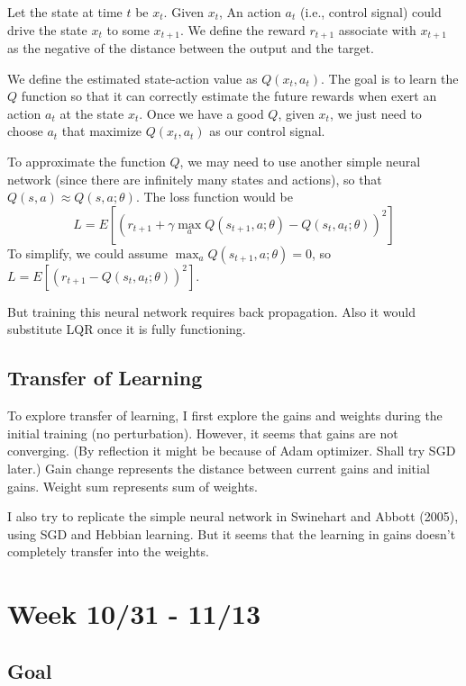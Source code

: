 \documentclass[12pt, a4paper]{article}
\begin{document}
Let the state at time $t$ be $x_t$. Given $x_t$, An action $a_t$ (i.e., control signal) could drive the state $x_t$ to some $x_{t+1}$. We define the reward $r_{t+1}$ associate with $x_{t+1}$ as the negative of the distance between the output and the target.

We define the estimated state-action value as $Q(x_t, a_t)$. The goal is to learn the $Q$ function so that it can correctly estimate the future rewards when exert an action $a_t$ at the state $x_t$. Once we have a good $Q$, given $x_t$, we just need to choose $a_t$ that maximize $Q(x_t, a_t)$ as our control signal.

To approximate the function $Q$, we may need to use another simple neural network (since there are infinitely many states and actions), so that $Q(s,a) \approx Q(s,a;\theta)$. The loss function would be 
$$ L = E \left[ \left( r_{t+1} + \gamma \max_{a} Q(s_{t+1},a; \theta) - Q(s_t, a_t; \theta) \right)^2 \right] $$
To simplify, we could assume $\max_{a} Q(s_{t+1}, a; \theta) = 0$, so $ L = E \left[ \left( r_{t+1} - Q(s_t, a_t; \theta) \right)^2 \right] $. 

But training this neural network requires back propagation. Also it would substitute LQR once it is fully functioning.

\newpage

\subsection*{Transfer of Learning}

To explore transfer of learning, I first explore the gains and weights during the initial training (no perturbation). However, it seems that gains are not converging. (By reflection it might be because of Adam optimizer. Shall try SGD later.) Gain change represents the distance between current gains and initial gains. Weight sum represents sum of weights.

I also try to replicate the simple neural network in Swinehart and Abbott (2005), using SGD and Hebbian learning. But it seems that the learning in gains doesn't completely transfer into the weights.

\newpage


\section*{Week 10/31 - 11/13}

\subsection*{Goal}
\end{document}
